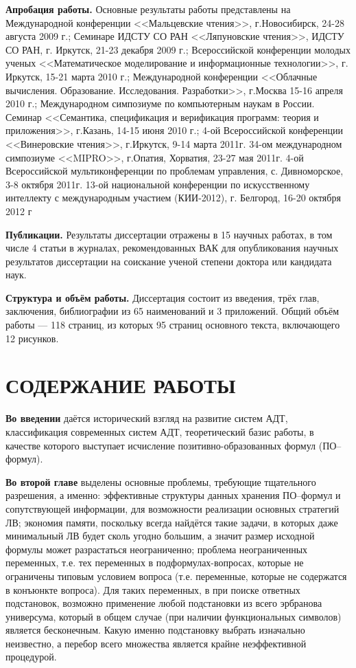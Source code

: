 \documentclass[a4paper]{report}
\begin{document}
\textbf{Апробация работы.}
Основные результаты работы представлены на Международной конференции <<Мальцевские чтения>>, г.Новосибирск, 24-28 августа 2009 г.;
Семинаре ИДСТУ СО РАН <<Ляпуновские чтения>>, ИДСТУ СО РАН, г. Иркутск, 21-23 декабря 2009 г.;
Всероссийской конференции молодых ученых <<Математическое моделирование и информационные технологии>>, г. Иркутск, 15-21 марта 2010 г.;
Международной конференции <<Облачные вычисления. Образование. Исследования. Разработки>>, г.Москва 15-16 апреля 2010 г.;
Международном симпозиуме по компьютерным наукам в России. Семинар <<Семантика, спецификация и верификация программ: теория и приложения>>, г.Казань, 14-15 июня 2010 г.;
4-ой Всероссийской конференции <<Винеровские чтения>>, г.Иркутск, 9-14 марта 2011г.
34-ом международном симпозиуме <<MIPRO>>, г.Опатия, Хорватия, 23-27 мая 2011г.
4-ой Всероссийской мультиконференции по проблемам управления, с. Дивноморское, 3-8 октября 2011г.
13-ой национальной конференции по искусственному интеллекту с международным участием (КИИ-2012), г. Белгород, 16-20 октября 2012 г


\textbf{Публикации.} Результаты диссертации отражены в 15 научных работах, в том числе 4 статьи в журналах, рекомендованных ВАК для опубликования научных результатов диссертации на соискание ученой степени доктора или кандидата наук.

\textbf{Структура и объём работы.} Диссертация состоит из введения, трёх глав, заключения, библиографии из 65 наименований и 3 приложений. Общий объём работы --- 118 страниц, из которых 95 страниц основного текста, включающего 12 рисунков.


\section*{СОДЕРЖАНИЕ РАБОТЫ}

\textbf{Во введении} даётся исторический взгляд на развитие систем АДТ, классификация современных систем АДТ, теоретический базис работы, в качестве которого выступает исчисление позитивно-образованных формул (ПО--формул).


\textbf{Во второй главе} выделены основные проблемы, требующие тщательного разрешения, а именно: эффективные структуры данных хранения ПО--формул и сопутствующей информации, для возможности реализации основных стратегий ЛВ; экономия памяти, поскольку всегда найдётся такие задачи, в которых даже минимальный ЛВ будет сколь угодно большим, а значит размер исходной формулы может разрастаться неограниченно; проблема неограниченных переменных, т.е. тех переменных в подформулах-вопросах, которые не ограничены типовым условием вопроса (т.е. переменные, которые не содержатся в конъюнкте вопроса). Для таких переменных, в при поиске ответных подстановок, возможно применение любой подстановки из всего эрбранова универсума, который в общем случае (при наличии функциональных символов) является бесконечным. Какую именно подстановку выбрать изначально неизвестно, а перебор всего множества является крайне неэффективной процедурой.
\end{document}
